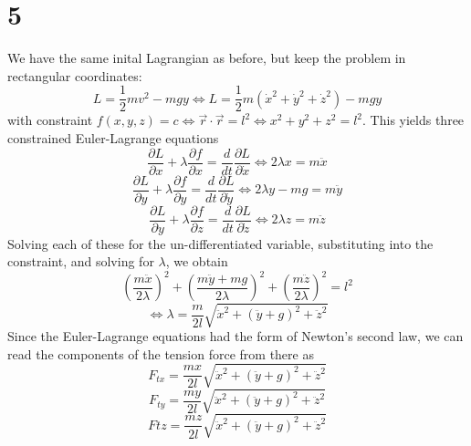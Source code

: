 \documentclass{article}
\begin{document}
\section*{5}
We have the same inital Lagrangian as before, but keep the problem in rectangular coordinates:
\[L=\frac{1}{2}mv^2-mgy\Leftrightarrow L=\frac{1}{2}m(\dot{x}^2+\dot{y}^2+\dot{z}^2)-mgy\]
with constraint $f(x,y,z)=c\Leftrightarrow\vec{r}\cdot\vec{r}=l^2\Leftrightarrow x^2+y^2+z^2=l^2$.
This yields three constrained Euler-Lagrange equations
\[\frac{\partial L}{\partial x}+\lambda\frac{\partial f}{\partial x}=\frac{d}{dt}\frac{\partial L}{\partial \dot{x}}\Leftrightarrow2\lambda x=m\ddot{x}\]
\[\frac{\partial L}{\partial y}+\lambda\frac{\partial f}{\partial y}=\frac{d}{dt}\frac{\partial L}{\partial \dot{y}}\Leftrightarrow2\lambda y-mg=m\ddot{y}\]
\[\frac{\partial L}{\partial y}+\lambda\frac{\partial f}{\partial z}=\frac{d}{dt}\frac{\partial L}{\partial \dot{z}}\Leftrightarrow2\lambda z=m\ddot{z}\]
Solving each of these for the un-differentiated variable, substituting into the constraint, and solving for $\lambda$, we obtain
\[\left( \frac{m\ddot{x}}{2\lambda} \right)^2+\left( \frac{m\ddot{y}+mg}{2\lambda} \right)^2+\left( \frac{m\ddot{z}}{2\lambda} \right)^2=l^2\]
\[\Leftrightarrow \lambda=\frac{m}{2l}\sqrt{\ddot{x}^2+(\ddot{y}+g)^2+\ddot{z}^2}\]
Since the Euler-Lagrange equations had the form of Newton's second law, we can read the components of the tension force from there as
\[F_{tx}=\frac{mx}{2l}\sqrt{\ddot{x}^2+(\ddot{y}+g)^2+\ddot{z}^2}\]
\[F_{ty}=\frac{my}{2l}\sqrt{\ddot{x}^2+(\ddot{y}+g)^2+\ddot{z}^2}\]
\[F{tz}=\frac{mz}{2l}\sqrt{\ddot{x}^2+(\ddot{y}+g)^2+\ddot{z}^2}\]
\end{document}
